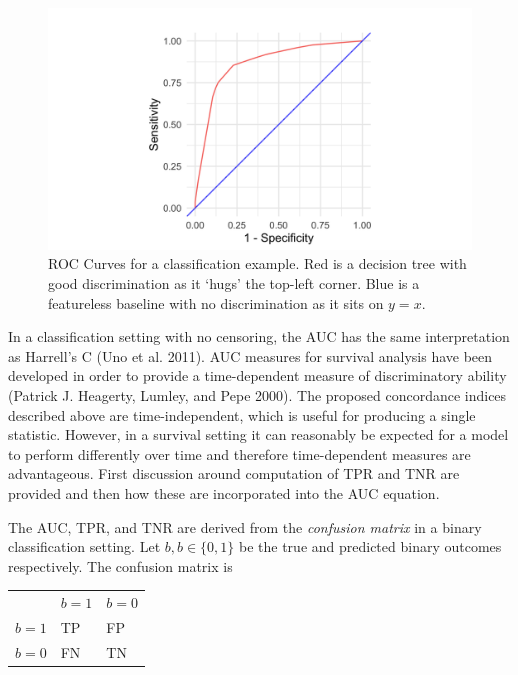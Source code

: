 \documentclass[
  letterpaper,
]{scrbook}
\theoremstyle{plain}
\theoremstyle{definition}
\theoremstyle{remark}
\begin{document}
\begin{figure}

{\centering \includegraphics{./images/evaluation/rocs.png}

}

\caption{\label{fig-eval-rocs}ROC Curves for a classification example.
Red is a decision tree with good discrimination as it `hugs' the
top-left corner. Blue is a featureless baseline with no discrimination
as it sits on \(y = x\).}

\end{figure}

In a classification setting with no censoring, the AUC has the same
interpretation as Harrell's C (Uno et al. 2011). AUC measures for
survival analysis have been developed in order to provide a
time-dependent measure of discriminatory ability (Patrick J. Heagerty,
Lumley, and Pepe 2000). The proposed concordance indices described above
are time-independent, which is useful for producing a single statistic.
However, in a survival setting it can reasonably be expected for a model
to perform differently over time and therefore time-dependent measures
are advantageous. First discussion around computation of TPR and TNR are
provided and then how these are incorporated into the AUC equation.

The AUC, TPR, and TNR are derived from the \emph{confusion matrix} in a
binary classification setting. Let \(b,\hat{b} \in \{0, 1\}\) be the
true and predicted binary outcomes respectively. The confusion matrix is

\begin{longtable}[]{@{}lll@{}}
\toprule()
\endhead
& \(b = 1\) & \(b = 0\) \\
\(\hat{b} = 1\) & TP & FP \\
\(\hat{b} = 0\) & FN & TN \\
\bottomrule()
\end{longtable}
\end{document}
